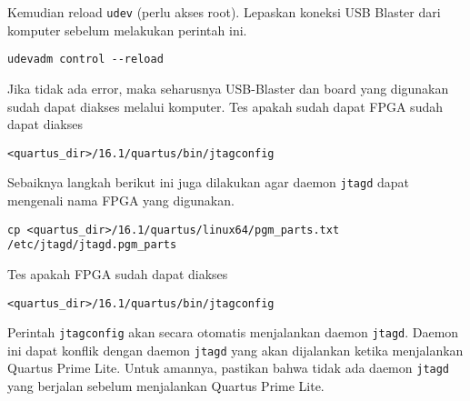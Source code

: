 Kemudian reload {\tt\small udev} (perlu akses root). Lepaskan koneksi USB
Blaster dari komputer sebelum melakukan perintah ini.
{\small
\begin{verbatim}
udevadm control --reload
\end{verbatim}
}

Jika tidak ada error, maka seharusnya USB-Blaster dan board yang digunakan sudah
dapat diakses melalui komputer.
Tes apakah sudah dapat FPGA sudah dapat diakses
{\small
\begin{verbatim}
<quartus_dir>/16.1/quartus/bin/jtagconfig
\end{verbatim}
}

Sebaiknya langkah berikut ini juga dilakukan agar daemon \verb|jtagd|
dapat mengenali
nama FPGA yang digunakan.
{\small
\begin{verbatim}
cp <quartus_dir>/16.1/quartus/linux64/pgm_parts.txt /etc/jtagd/jtagd.pgm_parts
\end{verbatim}
}

Tes apakah FPGA sudah dapat diakses
{\small
\begin{verbatim}
<quartus_dir>/16.1/quartus/bin/jtagconfig
\end{verbatim}
}



Perintah {\tt\small jtagconfig} akan secara otomatis menjalankan daemon
{\tt\small jtagd}.
Daemon ini dapat konflik dengan daemon {\tt\small jtagd} yang akan dijalankan
ketika menjalankan Quartus Prime Lite. Untuk amannya, pastikan bahwa
tidak ada daemon {\tt\small jtagd} yang berjalan sebelum menjalankan
Quartus Prime Lite.
